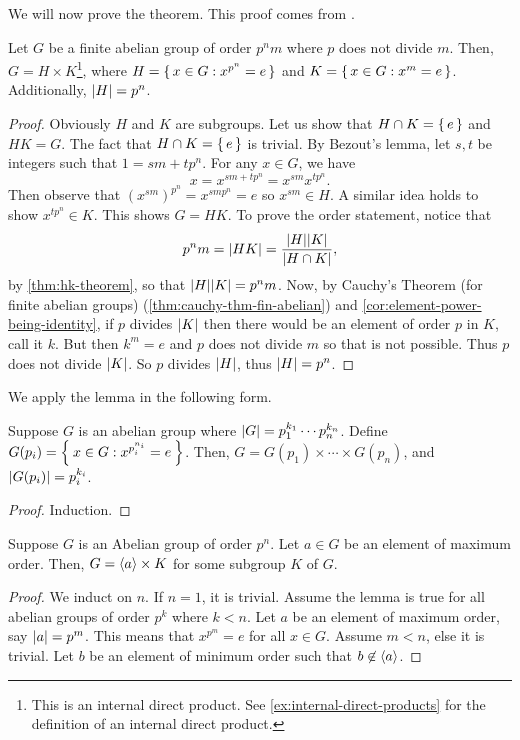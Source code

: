\documentclass[./main.tex]{subfiles}
\begin{document}
We will now prove the theorem. This proof comes from \autocite[Ch~11]{Gallian_2020}. 

\begin{lemma}
    Let $G$ be a finite abelian group of order $p^n m$ where $p$ does not divide
    $m$. Then, $G = H \times K$\footnote{This is an internal direct product. See
    \cref{ex:internal-direct-products} for the definition of an internal direct
    product.}, where $H = \set{x \in G: x^{p^n} = e}$ and $K = \set{x \in G: x^m
    = e}$. Additionally, $\abs H = p^n$.
\end{lemma}
\begin{proof}
    Obviously $H$ and $K$ are subgroups. Let us show that $H \cap K = \set{e}$
    and $HK = G$. The fact that $H \cap K = \set{e}$ is trivial. By Bezout's
    lemma, let $s, t$ be integers such that $1 = sm + tp^n$. For any $x \in G$,
    we have
    \[
        x = x^{sm + tp^n} = x^{sm} x^{tp^n}.
    \]
    Then observe that $(x^{sm})^{p^n} = x^{sm p^n} = e$ so $x^{sm} \in H$. A
    similar idea holds to show $x^{tp^n} \in K$. This shows $G = HK$. To prove
    the order statement, notice that
    \[
        p^n m = \abs{HK} = \frac{\abs{H} \abs K}{\abs{H \cap K}},
    \]
    by \cref{thm:hk-theorem}, so that $\abs{H} \abs K = p^n m$. Now, by Cauchy's
    Theorem (for finite abelian groups) (\cref{thm:cauchy-thm-fin-abelian}) and
    \cref{cor:element-power-being-identity}, if $p$ divides $\abs K$ then there
    would be an element of order $p$ in $K$, call it $k$. But then $k^m  = e$
    and $p$ does not divide $m$ so that is not possible. Thus $p$ does not
    divide $\abs K$. So $p$ divides $\abs H$, thus $\abs{H} = p^n$.
\end{proof}

We apply the lemma in the following form.
\begin{corollary}
    Suppose $G$ is an abelian group where $\abs{G} = p_1^{k_1} \cdots
    p_n^{k_n}$. Define $G(p_i) = \Set{x \in G : x^{p_i^{n_i}} = e}$. Then, $G =
    G(p_1) \times \cdots \times G(p_n)$, and $\abs{G(p_i)} = p_i^{k_i}$.
\end{corollary}
\begin{proof}
    Induction.
\end{proof}


\begin{lemma}
    Suppose $G$ is an Abelian group of order $p^n$. Let $a \in G$ be an element
    of maximum order. Then, $G = { \langle a \rangle } \times K$ for some subgroup $K$ of $G$.
\end{lemma}
\begin{proof}
    We induct on $n$. If $n=1$, it is trivial. Assume the lemma is true for all
    abelian groups of order $p^k$ where $k < n$. Let $a$ be an element of
    maximum order, say $\abs a = p^m$. This means that $x^{p^m} = e$ for all $x
    \in G$. Assume $m < n$, else it is trivial. Let $b$ be an element of minimum
    order such that $b \not \in { \langle a \rangle }$.
\end{proof}
\end{document}
